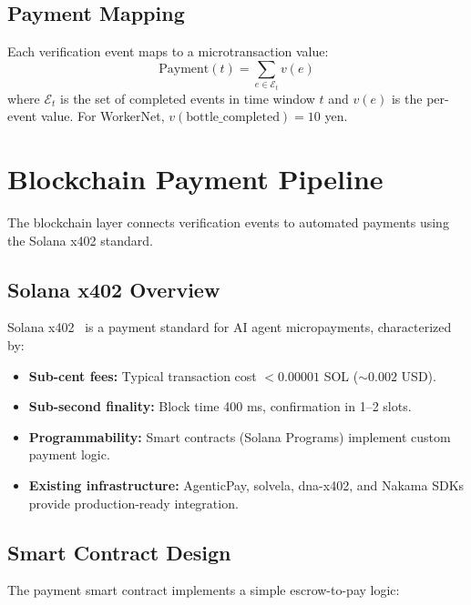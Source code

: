 \documentclass[10pt,twocolumn]{article}
\begin{document}
\subsection{Payment Mapping}

Each verification event maps to a microtransaction value:
\begin{equation}
\text{Payment}(t) = \sum_{e \in \mathcal{E}_t} v(e)
\label{eq:payment}
\end{equation}
where $\mathcal{E}_t$ is the set of completed events in time window $t$ and $v(e)$ is the per-event value. For WorkerNet, $v(\text{bottle\_completed}) = 10$ yen.

\FloatBarrier

\section{Blockchain Payment Pipeline}
\label{sec:blockchain}

The blockchain layer connects verification events to automated payments using the Solana x402 standard.

\subsection{Solana x402 Overview}

Solana x402~\cite{solana2024x402} is a payment standard for AI agent micropayments, characterized by:
\begin{itemize}[nosep]
\item \textbf{Sub-cent fees:} Typical transaction cost $< 0.00001$ SOL ($\sim 0.002$ USD).
\item \textbf{Sub-second finality:} Block time 400 ms, confirmation in 1--2 slots.
\item \textbf{Programmability:} Smart contracts (Solana Programs) implement custom payment logic.
\item \textbf{Existing infrastructure:} AgenticPay, solvela, dna-x402, and Nakama SDKs provide production-ready integration.
\end{itemize}

\subsection{Smart Contract Design}

The payment smart contract implements a simple escrow-to-pay logic:
\end{document}

